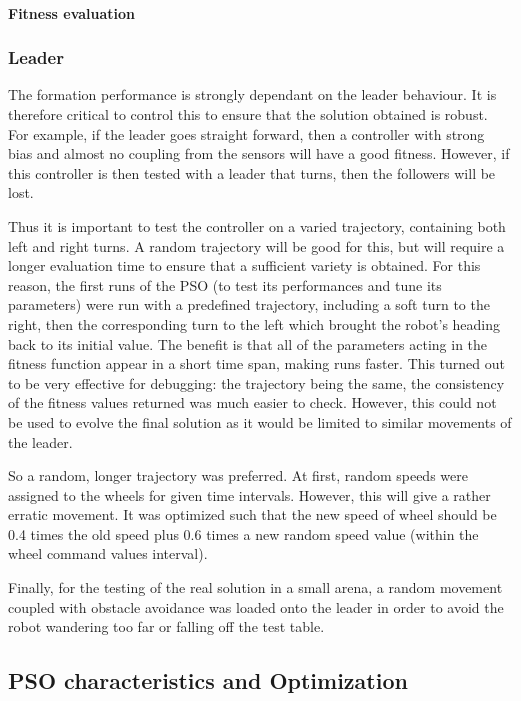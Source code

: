 \documentclass[a4, 10 pt, conference]{ieeeconf}  %
\begin{document}
\paragraph{Fitness evaluation}

\subsubsection{Leader}
The formation performance is strongly dependant on the leader behaviour. It is therefore critical to control this to ensure that the solution obtained is robust. For example, if the leader goes straight forward, then a controller with strong bias and almost no coupling from the sensors will have a good fitness. However, if this controller is then tested with a leader that turns, then the followers will be lost. 

Thus it is important to test the controller on a varied trajectory, containing both left and right turns. A random trajectory will be good for this, but will require a longer evaluation time to ensure that a sufficient variety is obtained. For this reason, the first runs of the PSO (to test its performances and tune its parameters) were run with a predefined trajectory, including a soft turn to the right, then the corresponding turn to the left which brought the robot's heading back to its initial value. The benefit is that all of the parameters acting in the fitness function appear in a short time span, making runs faster. This turned out to be very effective for debugging: the trajectory being the same, the consistency of the fitness values returned was much easier to check. However, this could not be used to evolve the final solution as it would be limited to similar movements of the leader.

So a random, longer trajectory was preferred. At first, random speeds were assigned to the wheels for given time intervals. However, this will give a rather erratic movement. It was optimized such that the new speed of wheel should be 0.4 times the old speed plus 0.6 times a new random speed value (within the wheel command values interval).

Finally, for the testing of the real solution in a small arena, a random movement coupled with obstacle avoidance was loaded onto the leader in order to avoid the robot wandering too far or falling off the test table.

\subsection{PSO characteristics and Optimization}
\end{document}
